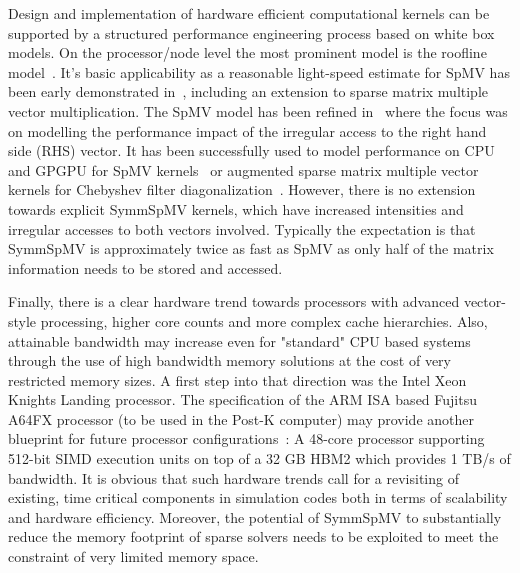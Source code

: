 Design and implementation of hardware efficient computational kernels can be supported by a structured performance engineering process based on white box models. On the processor/node level the most prominent model is the roofline model~\cite{Williams_roofline}. It's basic applicability as a reasonable light-speed estimate for \acrshort{SpMV} has been early demonstrated in~\cite{Gropp:1999}, including an extension to {\GW sparse matrix multiple vector multiplication}. The \acrshort{SpMV} model has been refined in~\cite{Moritz_sell} where the focus was on modelling the performance impact of the irregular access to the {\GW right hand side (RHS)} vector. It has been successfully used to model performance on CPU and GPGPU for \acrshort{SpMV} kernels~\cite{Moritz_sell} or augmented sparse matrix multiple vector kernels for Chebyshev filter diagonalization~\cite{ISC2018:ChebFD}. However, there is no extension towards explicit \acrshort{SymmSpMV} kernels, which have increased intensities and irregular accesses to both vectors involved. Typically the expectation is that \acrshort{SymmSpMV} is approximately twice as fast as \acrshort{SpMV} as only half of the matrix information needs to be stored and accessed. 

Finally, there is a clear hardware trend towards processors with advanced vector-style processing, higher core counts and more complex cache hierarchies. Also, attainable bandwidth may increase even for "standard" CPU based systems through the use of high bandwidth memory solutions at the cost of very restricted memory sizes. A first step into that direction was the Intel Xeon Knights Landing processor. The specification of the ARM ISA based Fujitsu A64FX processor (to be used in the Post-K computer) may provide another blueprint for future processor configurations~\cite{Post-K:Processor}: A 48-core processor supporting 512-bit SIMD execution units on top of a 32 GB HBM2 which provides 1 TB/s of bandwidth.  It is obvious that such hardware trends call for a revisiting of existing, time critical components in simulation codes both in terms of scalability and hardware efficiency. Moreover, the potential of \acrshort{SymmSpMV} to substantially reduce the memory footprint of sparse solvers needs to be exploited to meet the constraint of very limited memory space. 

